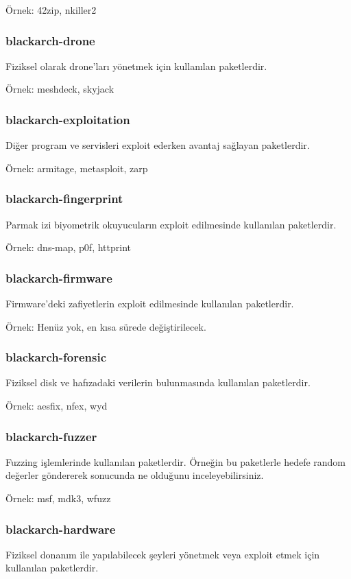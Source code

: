 \documentclass[a4paper, oneside, 11pt]{book}
\begin{document}
Örnek: 42zip, nkiller2

\subsubsection{blackarch-drone}
Fiziksel olarak drone'ları yönetmek için kullanılan paketlerdir.

Örnek: meshdeck, skyjack

\subsubsection{blackarch-exploitation}
Diğer program ve servisleri exploit ederken avantaj sağlayan paketlerdir.

Örnek: armitage, metasploit, zarp

\subsubsection{blackarch-fingerprint}
Parmak izi biyometrik okuyucuların exploit edilmesinde kullanılan paketlerdir.

Örnek: dns-map, p0f, httprint

\subsubsection{blackarch-firmware}
Firmware'deki zafiyetlerin exploit edilmesinde kullanılan paketlerdir.

Örnek: Henüz yok, en kısa sürede değiştirilecek.

\subsubsection{blackarch-forensic}
Fiziksel disk ve hafızadaki verilerin bulunmasında kullanılan paketlerdir.

Örnek: aesfix, nfex, wyd

\subsubsection{blackarch-fuzzer}
Fuzzing işlemlerinde kullanılan paketlerdir. Örneğin bu paketlerle hedefe random değerler göndererek sonucunda ne olduğunu inceleyebilirsiniz.

Örnek: msf, mdk3, wfuzz

\subsubsection{blackarch-hardware}
Fiziksel donanım ile yapılabilecek şeyleri yönetmek veya exploit etmek için kullanılan paketlerdir.
\end{document}
